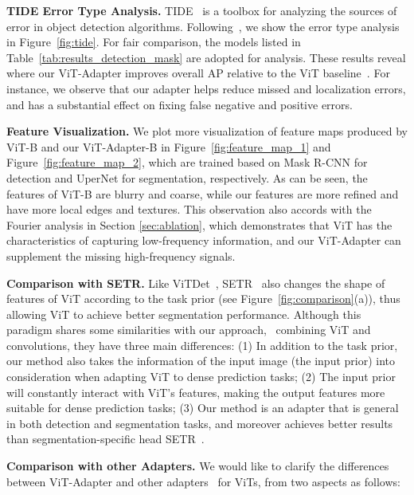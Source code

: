 \documentclass{article} \usepackage{iclr2023_conference,times}
\begin{document}
\noindent\textbf{TIDE Error Type Analysis.}
TIDE~\citep{bolya2020tide} is a toolbox for analyzing the sources of error in object detection algorithms.
Following~\citep{li2021benchmarking}, we show the error type analysis in Figure~\ref{fig:tide}.
For fair comparison, the models listed in Table~\ref{tab:results_detection_mask} are adopted for analysis.
These results reveal where our ViT-Adapter improves overall AP relative to the ViT baseline~\citep{li2021benchmarking}.
For instance, we observe that our adapter helps reduce missed and localization errors, and has a substantial effect on fixing false negative and positive errors. 


\noindent\textbf{Feature Visualization.}
We plot more visualization of feature maps produced by ViT-B \citep{li2021benchmarking} and our ViT-Adapter-B in Figure~\ref{fig:feature_map_1} and Figure~\ref{fig:feature_map_2}, which are trained based on Mask R-CNN for detection and UperNet for segmentation, respectively.
As can be seen, the features of ViT-B are blurry and coarse, while our features are more refined and have more local edges and textures. 
This observation also accords with the Fourier analysis in Section \ref{sec:ablation}, which demonstrates that ViT has the characteristics of capturing low-frequency information, and our ViT-Adapter can supplement the missing high-frequency signals.






\textbf{Comparison with SETR.}
Like ViTDet~\citep{li2022exploring}, SETR~\citep{zheng2021rethinking} also changes the shape of features of ViT according to the task prior (see Figure~\ref{fig:comparison}(a)), thus allowing ViT to achieve better segmentation performance. Although this paradigm shares some similarities with our approach, \eg~combining ViT and convolutions, they have three main differences:
(1) In addition to the task prior, our method also takes the information of the input image (the input prior) into consideration when adapting ViT to dense prediction tasks;
(2) The input prior will constantly interact with ViT's features, making the output features more suitable for dense prediction tasks;
(3) Our method is an adapter that is general in both detection and segmentation tasks, and moreover achieves better results than segmentation-specific head SETR~\citep{zheng2021rethinking}.




\textbf{Comparison with other Adapters.} 
We would like to clarify the differences between ViT-Adapter and other adapters~\citep{jia2022visual,bahng2022exploring,chen2022adaptformer,zhang2022neural,jie2022convolutional} for ViTs, from two aspects as follows:
\end{document}
